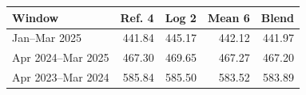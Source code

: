 \begin{tabular}{lrrrr}
\toprule
Window & Ref. 4 & Log 2 & Mean 6 & Blend \\
\midrule
Jan--Mar 2025 & 441.84 & 445.17 & 442.12 & 441.97 \\
Apr 2024--Mar 2025 & 467.30 & 469.65 & 467.27 & 467.20 \\
Apr 2023--Mar 2024 & 585.84 & 585.50 & 583.52 & 583.89 \\
\bottomrule
\end{tabular}
